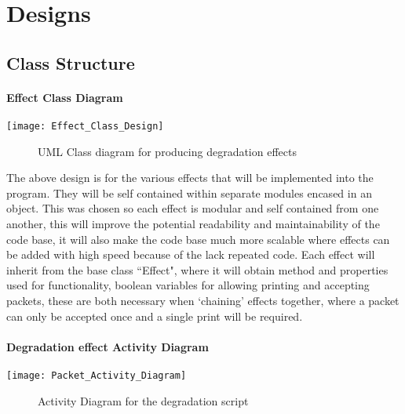 \chapter{Designs}

\section{Class Structure}
\subsubsection{Effect Class Diagram}

\begin{center}
	\texttt{[image: Effect\_Class\_Design]}
	\begin{figure}[h]
		\caption{UML Class diagram for producing degradation effects}
	\end{figure}
\end{center}

The above design is for the various effects that will be implemented into the program. They will be self contained within separate modules encased in an object. This was chosen so each effect is modular and self contained from one another, this will improve the potential readability and maintainability of the code base, it will also make the code base much more scalable where effects can be added with high speed because of the lack repeated code.  Each effect will inherit from the base class ``Effect", where it will obtain method and properties used for functionality, boolean variables for allowing printing and accepting packets, these are both necessary when `chaining' effects together, where a packet can only be accepted once and a single print will be required.

\subsubsection{Degradation effect Activity Diagram}

\begin{center}
	\texttt{[image: Packet\_Activity\_Diagram]}
	\begin{figure}[h]
		\caption{Activity Diagram for the degradation script}
	\end{figure}
\end{center}

